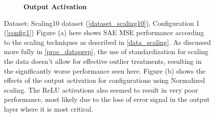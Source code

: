 \documentclass[a4paper,11pt,oneside]{article}
\theoremstyle{plain}
\theoremstyle{definition}
\begin{document}
\begin{figure}[H]
\begin{subfigure}{.5\textwidth}
			\caption[MSE by Scaling and Output Activations (Actual Data) - Output Activation]{\textbf{Output Activation} 
				\newline }
			\label{figure-actual_mse_output}
		\end{subfigure}
		\caption[MSE by Scaling and Output Activations (Actual Data)]{Dataset: Scaling10 dataset (\ref{dataset_scaling10}), Configuration 1 (\ref{config1})
			\newline Figure (a) here shows SAE MSE performance according to the scaling techniques as described in \ref{data_scaling}. As discussed more fully in \ref{proc_dataprep}, the use of standardization for scaling the data doesn't allow for effective outlier treatments, resulting in the significantly worse performance seen here.
			\newline Figure (b) shows the effects of the output activation for configurations using Normalized scaling. The ReLU activations also seemed to result in very poor performance, most likely due to the loss of error signal in the output layer where it is most critical. }
		\label{figure-mse_scaling}
	\end{figure}
	
\end{document}
